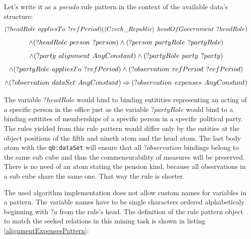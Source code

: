 Let's write it as a \textit{pseudo} rule pattern in the context of the available data's structure:
$$
(?headRole\hspace{0.4em}appliesTo\hspace{0.4em}?refPeriod) (\langle Czech\_Republic\rangle\hspace{0.4em}headOfGovernment\hspace{0.4em}?headRole) 
$$
$$
\land (?headRole\hspace{0.4em}person\hspace{0.4em}?person) \land (?person\hspace{0.4em}partyRole\hspace{0.4em}?partyRole) 
$$
$$
\land (?party\hspace{0.4em}alignment\hspace{0.4em}AnyConstant) \land (?partyRole\hspace{0.4em}party\hspace{0.4em}?party) 
$$
$$
\land (?partyRole\hspace{0.4em}appliesTo\hspace{0.4em}?refPeriod) \land (?observation\hspace{0.4em}refPeriod\hspace{0.4em}?refPeriod)
$$
$$
\land (?observation\hspace{0.4em}dataSet\hspace{0.4em}AnyConstant) \Rightarrow (?observation\hspace{0.4em}expenses\hspace{0.4em}AnyConstant)
$$

The variable $?headRole$ would bind to binding entitities representing an acting of a specific person in the office just as the variable $?partyRole$ would bind to a binding entitites of memberships of a specific person in a specific political party. The rules yielded from this rule pattern would differ only by the entities at the object positions of the fifth and nineth atom and the head atom. The last body atom with the \verb|qb:dataSet| will ensure that all $?observation$ bindings belong to the same sub cube and thus the commensurability of measures will be preserved. There is no need of an atom stating the pension kind, because all observations in a sub cube share the same one. That way the rule is shorter.

The used algorithm implementation does not allow custom names for variables in a pattern. The variable names have to be single characters ordered alphabeticaly beginning with $?a$ from the rule's head. The definition of the rule pattern object to match the seeked relations in this mining task is shown in listing \ref{alignmentExpensesPattern}:

